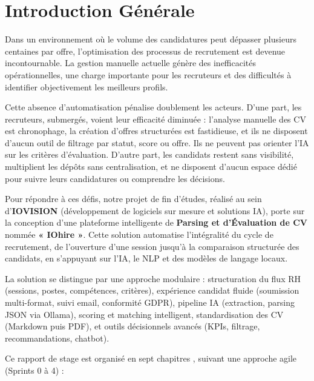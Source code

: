 \documentclass[12pt,a4paper,oneside]{report}
\begin{document}
\tableofcontents
\listoffigures %
\listoftables %
\newpage


\chapter*{Introduction Générale}

Dans un environnement où le volume des candidatures peut dépasser plusieurs centaines par offre, l'optimisation des processus de recrutement est devenue incontournable. La gestion manuelle actuelle génère des inefficacités opérationnelles, une charge importante pour les recruteurs et des difficultés à identifier objectivement les meilleurs profils.

Cette absence d'automatisation pénalise doublement les acteurs. D'une part, les recruteurs, submergés, voient leur efficacité diminuée : l'analyse manuelle des CV est chronophage, la création d'offres structurées est fastidieuse, et ils ne disposent d'aucun outil de filtrage par statut, score ou offre. Ils ne peuvent pas orienter l'IA sur les critères d'évaluation. D'autre part, les candidats restent sans visibilité, multiplient les dépôts sans centralisation, et ne disposent d'aucun espace dédié pour suivre leurs candidatures ou comprendre les décisions.

Pour répondre à ces défis, notre projet de fin d'études, réalisé au sein d'\textbf{IOVISION} (développement de logiciels sur mesure et solutions IA), porte sur la conception d'une plateforme intelligente de \textbf{Parsing et d'Évaluation de CV} nommée \textbf{« IOhire »}. Cette solution automatise l'intégralité du cycle de recrutement, de l'ouverture d'une session jusqu'à la comparaison structurée des candidats, en s'appuyant sur l'IA, le NLP et des modèles de langage locaux.

La solution se distingue par une approche modulaire : structuration du flux RH (sessions, postes, compétences, critères), expérience candidat fluide (soumission multi-format, suivi email, conformité GDPR), pipeline IA (extraction, parsing JSON via Ollama), scoring et matching intelligent, standardisation des CV (Markdown puis PDF), et outils décisionnels avancés (KPIs, filtrage, recommandations, chatbot).

\vspace{0.5cm}
Ce rapport de stage est organisé en sept chapitres , suivant une approche agile (Sprints 0 à 4) :
\end{document}

